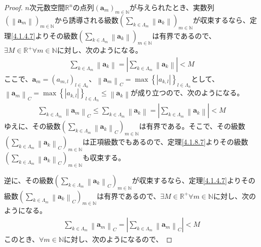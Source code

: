 \documentclass[dvipdfmx]{jsarticle}
\begin{document}
\begin{proof}
$n$次元数空間$\mathbb{R}^{n}$の点列$\left( \mathbf{a}_{m} \right)_{m \in \mathbb{N}}$が与えられたとき、実数列$\left( \left\| \mathbf{a}_{m} \right\| \right)_{m \in \mathbb{N}}$から誘導される級数$\left( \sum_{k \in \varLambda_{m}} \left\| \mathbf{a}_{k} \right\| \right)_{m \in \mathbb{N}}$が収束するなら、定理\ref{4.1.4.7}よりその級数$\left( \sum_{k \in \varLambda_{m}} \left\| \mathbf{a}_{k} \right\| \right)_{m \in \mathbb{N}}$は有界であるので、$\exists M \in \mathbb{R}^{+}\forall m \in \mathbb{N}$に対し、次のようになる。
\begin{align*}
\sum_{k \in \varLambda_{m}} \left\| \mathbf{a}_{k} \right\| = \left| \sum_{k \in \varLambda_{m}} \left\| \mathbf{a}_{k} \right\| \right| < M
\end{align*}
ここで、$\mathbf{a}_{m} = \left( a_{m,l} \right)_{l \in \varLambda_{n}}$、$\left\| \mathbf{a}_{m} \right\|_{C} = \max\left\{ \left| a_{k,l} \right| \right\}_{l \in \varLambda_{n}}$として、$\left\| \mathbf{a}_{m} \right\|_{C} = \max\left\{ \left| a_{k,l} \right| \right\}_{l \in \varLambda_{n}} \leq \left\| \mathbf{a}_{k} \right\|$が成り立つので、次のようになる。
\begin{align*}
\sum_{k \in \varLambda_{m}} \left\| \mathbf{a}_{m} \right\|_{C} \leq \sum_{k \in \varLambda_{m}} \left\| \mathbf{a}_{k} \right\| = \left| \sum_{k \in \varLambda_{m}} \left\| \mathbf{a}_{k} \right\| \right| < M
\end{align*}
ゆえに、その級数$\left( \sum_{k \in \varLambda_{m}} \left\| \mathbf{a}_{k} \right\|_{C} \right)_{m \in \mathbb{N}}$は有界である。そこで、その級数$\left( \sum_{k \in \varLambda_{m}} \left\| \mathbf{a}_{k} \right\|_{C} \right)_{m \in \mathbb{N}}$は正項級数でもあるので、定理\ref{4.1.8.7}よりその級数$\left( \sum_{k \in \varLambda_{m}} \left\| \mathbf{a}_{k} \right\|_{C} \right)_{m \in \mathbb{N}}$も収束する。\par
逆に、その級数$\left( \sum_{k \in \varLambda_{m}} \left\| \mathbf{a}_{k} \right\|_{C} \right)_{m \in \mathbb{N}}$が収束するなら、定理\ref{4.1.4.7}よりその級数$\left( \sum_{k \in \varLambda_{m}} \left\| \mathbf{a}_{k} \right\|_{C} \right)_{m \in \mathbb{N}}$は有界であるので、$\exists M \in \mathbb{R}^{+}\forall m \in \mathbb{N}$に対し、次のようになる。
\begin{align*}
\sum_{k \in \varLambda_{m}} \left\| \mathbf{a}_{m} \right\|_{C} = \left| \sum_{k \in \varLambda_{m}} \left\| \mathbf{a}_{m} \right\|_{C} \right| < M
\end{align*}
このとき、$\forall m \in \mathbb{N}$に対し、次のようになるので、

\end{proof}
\end{document}
